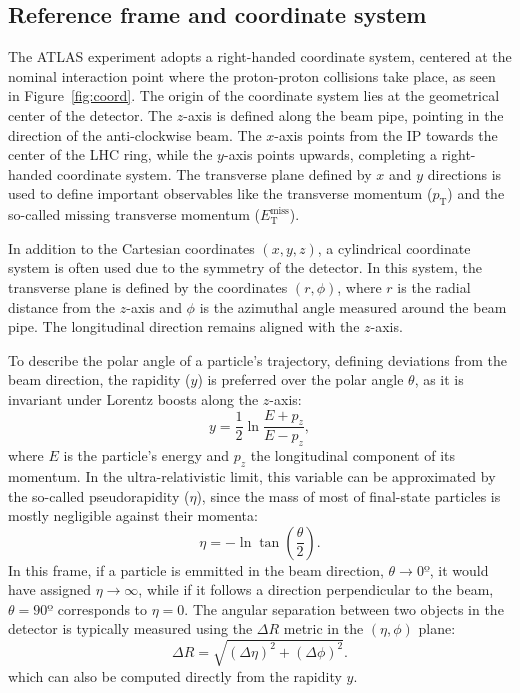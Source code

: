 \subsection{Reference frame and coordinate system}
\label{sec:coordinates}

The ATLAS experiment adopts a right-handed coordinate system, centered at the nominal interaction point where the proton-proton collisions take place, as seen in Figure~\ref{fig:coord}. The origin of the coordinate system lies at the geometrical center of the detector. The $z$-axis is defined along the beam pipe, pointing in the direction of the anti-clockwise beam. The $x$-axis points from the IP towards the center of the LHC ring, while the $y$-axis points upwards, 
completing a right-handed coordinate system. The transverse plane defined by $x$ and $y$ directions is used to define important observables like the transverse momentum ($p_{\text{T}}$) and the so-called missing transverse momentum ($E^{\text{miss}}_{\text{T}}$).

In addition to the Cartesian coordinates $(x, y, z)$, a cylindrical coordinate system is often used due to the symmetry of the detector. In this system, the transverse plane is defined by the coordinates $(r, \phi)$, where $r$ is the radial distance from the $z$-axis and $\phi$ is the azimuthal angle measured around the beam pipe. The longitudinal direction remains aligned with the $z$-axis.

To describe the polar angle of a particle’s trajectory, defining deviations from the beam direction, the rapidity ($y$) is preferred over the polar angle $\theta$, as it is invariant under Lorentz boosts along the $z$-axis:
\begin{equation}
    y = \frac{1}{2}\ln{\frac{E+p_{z}}{E-{p_{z}}}},
\end{equation}
where $E$ is the particle's energy and $p_{z}$ the longitudinal component of its momentum. In the ultra-relativistic limit, this variable can be approximated by the so-called pseudorapidity ($\eta$), since the mass of most of final-state particles is mostly negligible against their momenta:
\begin{equation}
\eta = -\ln \tan \left( \frac{\theta}{2} \right).
\end{equation}
In this frame, if a particle is emmitted in the beam direction, $\theta \rightarrow 0º$, it would have assigned $\eta \rightarrow \infty$, while if it follows a direction perpendicular to the beam, $\theta = 90º$ corresponds to $\eta = 0$.
The angular separation between two objects in the detector is typically measured using the $\Delta R$ metric in the $(\eta, \phi)$ plane:
\begin{equation}
\Delta R = \sqrt{(\Delta \eta)^2 + (\Delta \phi)^2}.
\end{equation}
which can also be computed directly from the rapidity $y$.

